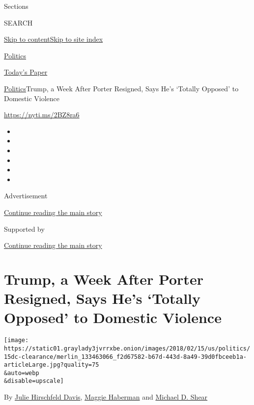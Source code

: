 Sections

SEARCH

\protect\hyperlink{site-content}{Skip to
content}\protect\hyperlink{site-index}{Skip to site index}

\href{https://www.nytimes3xbfgragh.onion/section/politics}{Politics}

\href{https://myaccount.nytimes3xbfgragh.onion/auth/login?response_type=cookie\&client_id=vi}{}

\href{https://www.nytimes3xbfgragh.onion/section/todayspaper}{Today's
Paper}

\href{/section/politics}{Politics}\textbar{}Trump, a Week After Porter
Resigned, Says He's `Totally Opposed' to Domestic Violence

\url{https://nyti.ms/2BZ8ra6}

\begin{itemize}
\item
\item
\item
\item
\item
\item
\end{itemize}

Advertisement

\protect\hyperlink{after-top}{Continue reading the main story}

Supported by

\protect\hyperlink{after-sponsor}{Continue reading the main story}

\hypertarget{trump-a-week-after-porter-resigned-says-hes-totally-opposed-to-domestic-violence}{%
\section{Trump, a Week After Porter Resigned, Says He's `Totally
Opposed' to Domestic
Violence}\label{trump-a-week-after-porter-resigned-says-hes-totally-opposed-to-domestic-violence}}

\texttt{[image: https://static01.graylady3jvrrxbe.onion/images/2018/02/15/us/politics/15dc-clearance/merlin\_133463066\_f2d67582-b67d-443d-8a49-39d0fbceeb1a-articleLarge.jpg?quality=75\\\&auto=webp\\\&disable=upscale]}

By
\href{https://www.nytimes3xbfgragh.onion/by/julie-hirschfeld-davis}{Julie
Hirschfeld Davis},
\href{http://www.nytimes3xbfgragh.onion/by/maggie-haberman}{Maggie
Haberman} and
\href{http://www.nytimes3xbfgragh.onion/by/michael-d-shear}{Michael D.
Shear}

